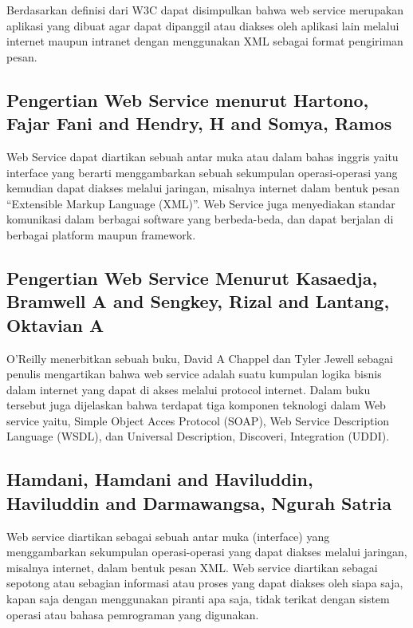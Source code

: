 Berdasarkan definisi dari W3C dapat disimpulkan bahwa web service merupakan aplikasi yang dibuat agar dapat dipanggil atau diakses oleh aplikasi lain melalui internet maupun intranet dengan menggunakan XML sebagai format pengiriman pesan\cite{prasetya2013perancangan}.

\subsection{Pengertian Web Service menurut Hartono, Fajar Fani and Hendry, H and Somya, Ramos}

	Web Service dapat diartikan sebuah antar muka atau dalam bahas inggris yaitu interface  yang berarti menggambarkan sebuah sekumpulan operasi-operasi yang kemudian dapat diakses melalui jaringan, misalnya internet dalam bentuk pesan “Extensible Markup Language (XML)”. Web Service juga menyediakan standar komunikasi dalam berbagai software yang berbeda-beda, dan dapat berjalan di berbagai platform maupun framework\cite{hartono2013aplikasi}.

\subsection{Pengertian Web Service Menurut Kasaedja, Bramwell A and Sengkey, Rizal and Lantang, Oktavian A}

	O’Reilly menerbitkan sebuah buku, David A Chappel dan Tyler Jewell sebagai penulis mengartikan bahwa web service adalah suatu kumpulan logika bisnis dalam internet yang dapat di akses melalui protocol internet. Dalam buku tersebut juga dijelaskan bahwa terdapat tiga komponen teknologi dalam Web service yaitu, Simple Object Acces Protocol (SOAP), Web Service Description Language (WSDL), dan Universal Description, Discoveri, Integration (UDDI)\cite{kasaedja2014rancang}.

\subsection{Hamdani, Hamdani and Haviluddin, Haviluddin and Darmawangsa, Ngurah Satria}

	Web service diartikan sebagai sebuah antar muka (interface) yang menggambarkan sekumpulan operasi-operasi yang dapat diakses melalui jaringan, misalnya internet, dalam bentuk pesan XML. Web service diartikan sebagai sepotong atau sebagian informasi atau proses yang dapat diakses oleh siapa saja, kapan saja dengan menggunakan piranti apa saja, tidak terikat dengan sistem operasi atau bahasa pemrograman yang digunakan.

